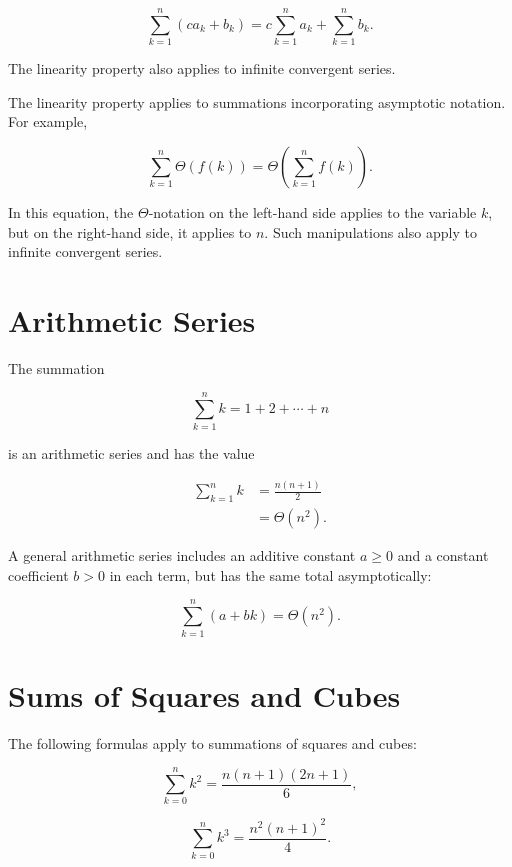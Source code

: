 \[
    \sum_{k=1}^n\left(c a_k+b_k\right)=c \sum_{k=1}^n a_k+\sum_{k=1}^n b_k .
\]

The linearity property also applies to infinite convergent series.

The linearity property applies to summations incorporating asymptotic notation. For example,

\[
    \sum_{k=1}^n \Theta(f(k))=\Theta\left(\sum_{k=1}^n f(k)\right) .
\]

In this equation, the $\Theta$-notation on the left-hand side applies to the variable $k$, but on the right-hand side, it applies to $n$. Such manipulations also apply to infinite convergent series.

\section*{Arithmetic Series}
The summation


\[
        \sum_{k=1}^n k=1+2+\cdots+n \label{eq:arithmetic-series}
\]

is an arithmetic series and has the value


\begin{align}
    \sum_{k=1}^n k & =\frac{n(n+1)}{2} \label{eq:sum-of-natural-numbers}  \\
    & =\Theta\left(n^2\right) . \label{eq:arithmetic-series-asymptotic}
\end{align}

A general arithmetic series includes an additive constant $a \geq 0$ and a constant coefficient $b>0$ in each term, but has the same total asymptotically:

\begin{equation}
    \sum_{k=1}^n(a+b k)=\Theta\left(n^2\right) . \label{eq:general-arithmetic-series}
    \end{equation}

\section*{Sums of Squares and Cubes}
The following formulas apply to summations of squares and cubes:

    \begin{equation}
    \sum_{k=0}^n k^2=\frac{n(n+1)(2 n+1)}{6}, \label{eq:sum-of-squares}
    \end{equation}

    \begin{equation}
        \sum_{k=0}^n k^3=\frac{n^2(n+1)^2}{4} . \label{eq:sum-of-cubes}
        \end{equation}


